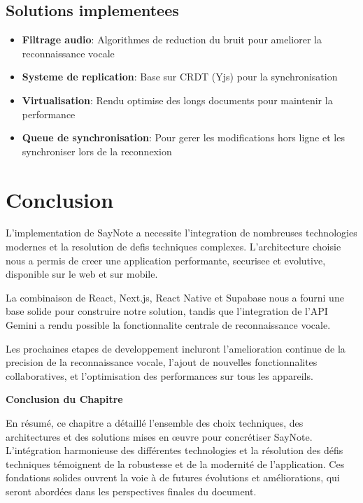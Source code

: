 \subsection{Solutions implementees}
\begin{itemize}
    \item \textbf{Filtrage audio}: Algorithmes de reduction du bruit pour ameliorer la reconnaissance vocale
    \item \textbf{Systeme de replication}: Base sur CRDT (Yjs) pour la synchronisation
    \item \textbf{Virtualisation}: Rendu optimise des longs documents pour maintenir la performance
    \item \textbf{Queue de synchronisation}: Pour gerer les modifications hors ligne et les synchroniser lors de la reconnexion
\end{itemize}



\section{Conclusion}
L'implementation de SayNote a necessite l'integration de nombreuses technologies modernes et la resolution de defis techniques complexes. L'architecture choisie nous a permis de creer une application performante, securisee et evolutive, disponible sur le web et sur mobile.

La combinaison de React, Next.js, React Native et Supabase nous a fourni une base solide pour construire notre solution, tandis que l'integration de l'API Gemini a rendu possible la fonctionnalite centrale de reconnaissance vocale.

Les prochaines etapes de developpement incluront l'amelioration continue de la precision de la reconnaissance vocale, l'ajout de nouvelles fonctionnalites collaboratives, et l'optimisation des performances sur tous les appareils. 

\vspace{1cm}
\begin{center}
\textbf{\large Conclusion du Chapitre}
\end{center}

\noindent
En résumé, ce chapitre a détaillé l'ensemble des choix techniques, des architectures et des solutions mises en œuvre pour concrétiser SayNote. L'intégration harmonieuse des différentes technologies et la résolution des défis techniques témoignent de la robustesse et de la modernité de l'application. Ces fondations solides ouvrent la voie à de futures évolutions et améliorations, qui seront abordées dans les perspectives finales du document.